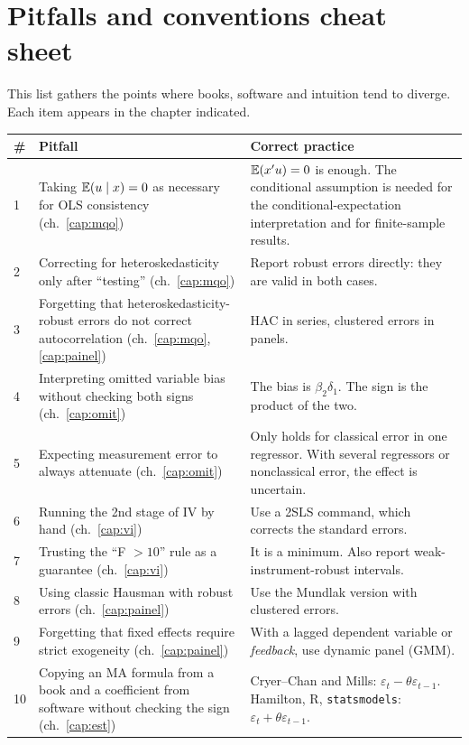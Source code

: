 \chapter{Pitfalls and conventions cheat sheet}
\label{cap:cola}

This list gathers the points where books, software and intuition tend to diverge. Each item appears in the chapter indicated.

\begin{center}
\small
\begin{longtable}{p{0.5cm}p{6.6cm}p{6.5cm}}
\toprule
\textbf{\#} & \textbf{Pitfall} & \textbf{Correct practice} \\
\midrule
\endhead
1 & Taking $\mathbb{E}(u\mid x)=0$ as necessary for OLS consistency (ch.~\ref{cap:mqo}) & $\mathbb{E}(x'u)=0$ is enough. The conditional assumption is needed for the conditional-expectation interpretation and for finite-sample results. \\
2 & Correcting for heteroskedasticity only after ``testing'' (ch.~\ref{cap:mqo}) & Report robust errors directly: they are valid in both cases. \\
3 & Forgetting that heteroskedasticity-robust errors do not correct autocorrelation (ch.~\ref{cap:mqo}, \ref{cap:painel}) & HAC in series, clustered errors in panels. \\
4 & Interpreting omitted variable bias without checking both signs (ch.~\ref{cap:omit}) & The bias is $\beta_2\delta_1$. The sign is the product of the two. \\
5 & Expecting measurement error to always attenuate (ch.~\ref{cap:omit}) & Only holds for classical error in one regressor. With several regressors or nonclassical error, the effect is uncertain. \\
6 & Running the 2nd stage of IV by hand (ch.~\ref{cap:vi}) & Use a 2SLS command, which corrects the standard errors. \\
7 & Trusting the ``F $>10$'' rule as a guarantee (ch.~\ref{cap:vi}) & It is a minimum. Also report weak-instrument-robust intervals. \\
8 & Using classic Hausman with robust errors (ch.~\ref{cap:painel}) & Use the Mundlak version with clustered errors. \\
9 & Forgetting that fixed effects require strict exogeneity (ch.~\ref{cap:painel}) & With a lagged dependent variable or \emph{feedback}, use dynamic panel (GMM). \\
10 & Copying an MA formula from a book and a coefficient from software without checking the sign (ch.~\ref{cap:est}) & Cryer--Chan and Mills: $\varepsilon_t-\theta\varepsilon_{t-1}$. Hamilton, R, \texttt{statsmodels}: $\varepsilon_t+\theta\varepsilon_{t-1}$. \\

\end{longtable}
\end{center}
